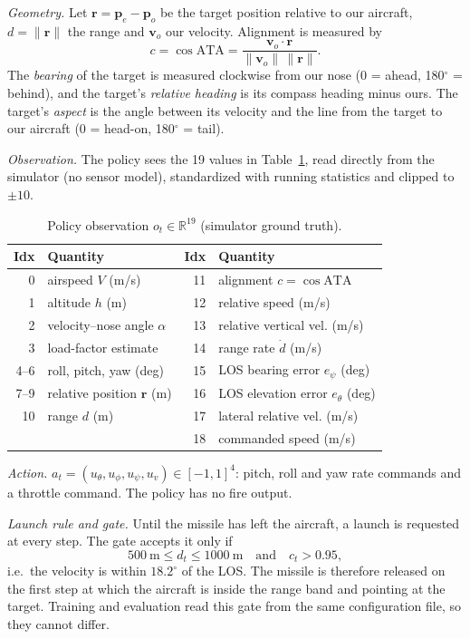 \documentclass[conference]{IEEEtran}
\newcommand{\cosata}{\cos\mathrm{ATA}}
\begin{document}
\emph{Geometry.} Let $\mathbf{r}=\mathbf{p}_e-\mathbf{p}_o$ be the target position relative to our aircraft, $d=\|\mathbf{r}\|$ the range and $\mathbf{v}_o$ our velocity. Alignment is measured by
\begin{equation}
c=\cosata=\frac{\mathbf{v}_o\cdot\mathbf{r}}{\|\mathbf{v}_o\|\,\|\mathbf{r}\|}.
\end{equation}
The \emph{bearing} of the target is measured clockwise from our nose (0 = ahead, 180$^\circ$ = behind), and the target's \emph{relative heading} is its compass heading minus ours. The target's \emph{aspect} is the angle between its velocity and the line from the target to our aircraft (0 = head-on, 180$^\circ$ = tail).

\emph{Observation.} The policy sees the 19 values in Table~\ref{tab:obs}, read directly from the simulator (no sensor model), standardized with running statistics and clipped to $\pm10$.

\begin{table}[t]
\centering
\caption{Policy observation $o_t\in\mathbb{R}^{19}$ (simulator ground truth).}
\label{tab:obs}
\footnotesize
\setlength{\tabcolsep}{4pt}
\begin{tabular}{@{}rl@{\hspace{8pt}}rl@{}}
\toprule
Idx & Quantity & Idx & Quantity \\
\midrule
0 & airspeed $V$ (m/s) & 11 & alignment $c=\cosata$ \\
1 & altitude $h$ (m) & 12 & relative speed (m/s) \\
2 & velocity--nose angle $\alpha$ & 13 & relative vertical vel. (m/s) \\
3 & load-factor estimate & 14 & range rate $\dot d$ (m/s) \\
4--6 & roll, pitch, yaw (deg) & 15 & LOS bearing error $e_\psi$ (deg) \\
7--9 & relative position $\mathbf{r}$ (m) & 16 & LOS elevation error $e_\theta$ (deg) \\
10 & range $d$ (m) & 17 & lateral relative vel. (m/s) \\
 & & 18 & commanded speed (m/s) \\
\bottomrule
\end{tabular}
\end{table}

\emph{Action.} $a_t=(u_\theta,u_\phi,u_\psi,u_v)\in[-1,1]^4$: pitch, roll and yaw rate commands and a throttle command. The policy has no fire output.

\emph{Launch rule and gate.} Until the missile has left the aircraft, a launch is requested at every step. The gate accepts it only if
\begin{equation}
500~\mathrm{m}\le d_t\le 1000~\mathrm{m}\quad\text{and}\quad c_t>0.95,
\label{eq:gate}
\end{equation}
i.e.\ the velocity is within $18.2^\circ$ of the LOS. The missile is therefore released on the first step at which the aircraft is inside the range band and pointing at the target. Training and evaluation read this gate from the same configuration file, so they cannot differ.
\end{document}
